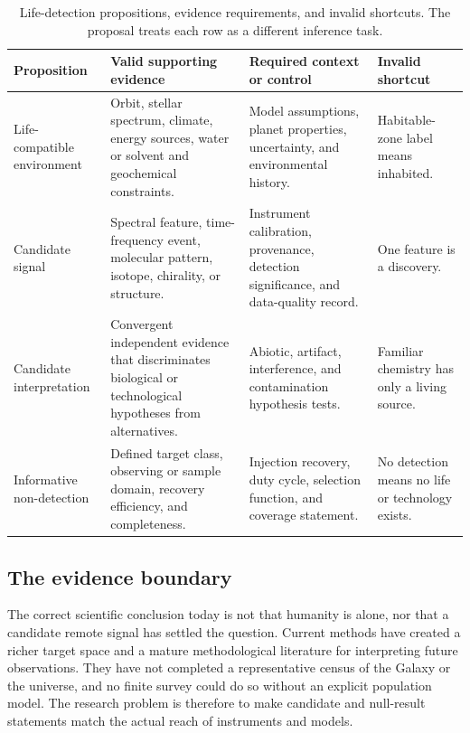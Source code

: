 \documentclass[conference]{IEEEtran}
\begin{document}
\begin{table}[t]
\caption{Life-detection propositions, evidence requirements, and invalid shortcuts. The proposal treats each row as a different inference task.}
\label{tab:propositions}
\centering
\footnotesize
\setlength{\tabcolsep}{3pt}
\begin{tabular}{p{} p{} p{} p{}}
\hline
\textbf{Proposition} & \textbf{Valid supporting evidence} & \textbf{Required context or control} & \textbf{Invalid shortcut}\\
\hline
Life-compatible environment & Orbit, stellar spectrum, climate, energy sources, water or solvent and geochemical constraints. & Model assumptions, planet properties, uncertainty, and environmental history. & Habitable-zone label means inhabited.\\
Candidate signal & Spectral feature, time-frequency event, molecular pattern, isotope, chirality, or structure. & Instrument calibration, provenance, detection significance, and data-quality record. & One feature is a discovery.\\
Candidate interpretation & Convergent independent evidence that discriminates biological or technological hypotheses from alternatives. & Abiotic, artifact, interference, and contamination hypothesis tests. & Familiar chemistry has only a living source.\\
Informative non-detection & Defined target class, observing or sample domain, recovery efficiency, and completeness. & Injection recovery, duty cycle, selection function, and coverage statement. & No detection means no life or technology exists.\\
\hline
\end{tabular}
\end{table}

\subsection{The evidence boundary}

The correct scientific conclusion today is not that humanity is alone, nor that a candidate remote signal has settled the question. Current methods have created a richer target space and a mature methodological literature for interpreting future observations. They have not completed a representative census of the Galaxy or the universe, and no finite survey could do so without an explicit population model. The research problem is therefore to make candidate and null-result statements match the actual reach of instruments and models.
\end{document}
